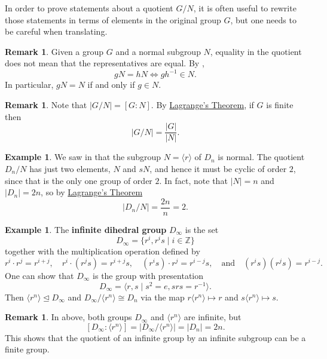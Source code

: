 \documentclass[12pt]{report}
\numberwithin{equation}{section}
\numberwithin{theorem}{chapter}
\theoremstyle{definition}
\newtheorem{example}[theorem]{Example}
\newtheorem*{basic properties}{Basic Properties}
\newtheorem*{Important Remark}{Important Remark}
\newtheorem{remark}[theorem]{Remark}
\newcommand{\df}[1]{{\bf #1}\index{#1}}
\newcommand{\Z}{\mathbb{Z}}
\def\norm{\mathrel{\unlhd}}
\begin{document}
In order to prove statements about a quotient $G/N$, it is often useful to rewrite those statements in terms of elements in the original group $G$, but one needs to be careful when translating.

\begin{remark}
	Given a group $G$ and a normal subgroup $N$, equality in the quotient does not mean that the representatives are equal. By , 
	$$gN = hN \iff gh^{-1} \in N.$$ 
	In particular, $gN = N$ if and only if $g \in N$.
\end{remark}





\begin{remark}\label{order of quotient}
Note that $|G/N| = [G :N ]$. By \hyperref[Lagrange]{Lagrange's Theorem}, if $G$ is finite then
$$\left | G/N\right | = \frac{|G|}{|N|}.$$
\end{remark}




\begin{example}\label{example quotient of D_n by rotations}
We saw in  that the subgroup $N = \langle r \rangle$ of $D_{n}$ is normal. The quotient $D_{n}/N$ has just two elements, $N$ and $sN$, and hence it must be cyclic of order $2$, since that is the only one group of order $2$. In fact, note that $|N| = n$ and $|D_n| = 2n$, so by \hyperref[Lagrange]{Lagrange's Theorem} 
$$|D_n/N| = \frac{2n}{n} =2.$$
\end{example}




\begin{example}\label{example D_infty}
	The \df{infinite dihedral group} $D_\infty$ is the set 
	$$D_\infty = \{r^i,r^is \mid i \in \Z\}$$ 
	together with the multiplication operation defined by 
	$$r^i \cdot r^j = r^{i+j}, \quad r^i \cdot (r^js) = r^{i+j}s, \quad (r^is) \cdot r^j = r^{i-j}s, \quad \textrm{and} \quad (r^is)(r^js) = r^{i-j}.$$
One can show that $D_\infty$ is the group with presentation
$$D_\infty=\langle r,s \mid s^2=e, srs=r^{-1}\rangle.$$
Then $\langle r^n \rangle \norm D_\infty$ and $D_\infty/ \langle r^n \rangle \cong D_{n}$ via the map $r\langle r^n \rangle\mapsto r$ and $s\langle r^n \rangle\mapsto s$.
\end{example}


\begin{remark}
In  above, both groups $D_\infty$ and $\langle r^n \rangle$ are infinite, but 
$$[D_\infty:\langle r^n \rangle]=\left|D_\infty/\langle r^n \rangle\right|=|D_{n}|=2n.$$
This shows that the quotient of an infinite group by an infinite subgroup can be a finite group.
\end{remark}
\end{document}
